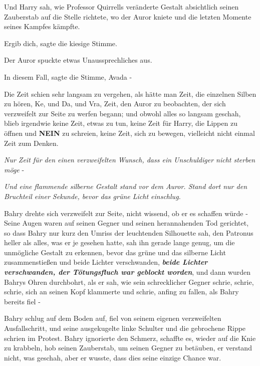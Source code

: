 Und Harry sah, wie Professor Quirrells veränderte Gestalt absichtlich seinen
Zauberstab auf die Stelle richtete, wo der Auror kniete und die letzten Momente
seines Kampfes kämpfte.

\glqq{}Ergib dich\grqq{}, sagte die kiesige Stimme.

Der Auror spuckte etwas Unaussprechliches aus.

\glqq{}In diesem Fall\grqq{}, sagte die Stimme, \glqq{}Avada -\grqq{}

Die Zeit schien sehr langsam zu vergehen, als hätte man Zeit, die einzelnen
Silben zu hören, Ke, und Da, und Vra, Zeit, den Auror zu beobachten, der sich
verzweifelt zur Seite zu werfen begann; und obwohl alles so langsam geschah,
blieb irgendwie keine Zeit, etwas zu tun, keine Zeit für Harry, die Lippen zu
öffnen und \textbf{NEIN} zu schreien, keine Zeit, sich zu bewegen, vielleicht
nicht einmal Zeit zum Denken.

\emph{Nur Zeit für den einen verzweifelten Wunsch, dass ein Unschuldiger nicht
sterben möge} -

\emph{Und eine flammende silberne Gestalt stand vor dem Auror. Stand dort nur
den Bruchteil einer Sekunde, bevor das grüne Licht einschlug.}

Bahry drehte sich verzweifelt zur Seite, nicht wissend, ob er es schaffen würde
- Seine Augen waren auf seinen Gegner und seinen herannahenden Tod gerichtet, so
dass Bahry nur kurz den Umriss der leuchtenden Silhouette sah, den Patronus
heller als alles, was er je gesehen hatte, sah ihn gerade lange genug, um die
unmögliche Gestalt zu erkennen, bevor das grüne und das silberne Licht
zusammenstießen und beide Lichter verschwanden, \textbf{\emph{beide Lichter
verschwanden, der Tötungsfluch war geblockt worden}}, und dann wurden Bahrys
Ohren durchbohrt, als er sah, wie sein schrecklicher Gegner schrie, schrie,
schrie, sich an seinen Kopf klammerte und schrie, anfing zu fallen, als Bahry
bereits fiel -

Bahry schlug auf dem Boden auf, fiel von seinem eigenen verzweifelten
Ausfallschritt, und seine ausgekugelte linke Schulter und die gebrochene Rippe
schrien im Protest. Bahry ignorierte den Schmerz, schaffte es, wieder auf die
Knie zu krabbeln, hob seinen Zauberstab, um seinen Gegner zu betäuben, er
verstand nicht, was geschah, aber er wusste, dass dies seine einzige Chance war.

